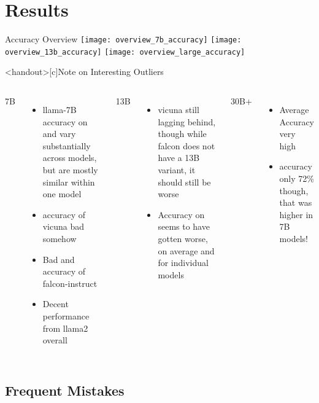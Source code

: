 \section{Results}

\begin{frame}{Accuracy Overview}
    \pause
    \texttt{[image: overview\_7b\_accuracy]}
    \texttt{[image: overview\_13b\_accuracy]}
    \texttt{[image: overview\_large\_accuracy]}
\end{frame}



\begin{frame}<handout>[c]{Note on Interesting Outliers}
    \begin{columns}
    7B
    \begin{itemize}
        \item \gls{llama}-7B accuracy on \ttemp and \ttime vary substantially across models, but are mostly similar within one model
        \item \tsolv accuracy of \gls{vicuna} bad somehow
        \item Bad \ttemp and \ttime accuracy of \gls{falcon}-instruct
        \item Decent performance from \gls{llama2} overall
    \end{itemize}
        \large
        13B
        \begin{itemize}
            \item \gls{vicuna} still lagging behind, though while \gls{falcon} does not have a 13B variant, it should still be worse
            \item Accuracy on \tsolv seems to have gotten worse, on average and for individual models
        \end{itemize}
        \large
        30B+
        \begin{itemize}
            \item Average Accuracy very high
            \item \tsolv accuracy only 72\% though, that was higher in 7B models!
        \end{itemize}
    \end{columns}
\end{frame}

\subsection{Frequent Mistakes}

